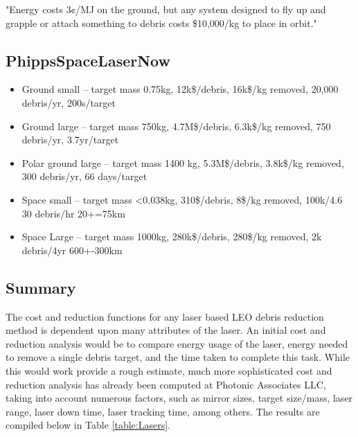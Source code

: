 \documentclass{article}
\begin{document}
"Energy costs 3¢/MJ on the ground, but any system designed to fly up and grapple or attach something to debris costs \$10,000/kg to place in orbit."


\subsection{PhippsSpaceLaserNow}\cite{PhippsSpaceLaserNow}

\begin{itemize}
\item Ground small -- target mass 0.75kg, 12k\$/debris, 16k\$/kg removed, 20,000 debris/yr, 200s/target

\item Ground large -- target mass 750kg, 4.7M\$/debris, 6.3k\$/kg removed, 750 debris/yr, 3.7yr/target

\item Polar ground large -- target mass 1400 kg, 5.3M\$/debris, 3.8k\$/kg removed, 300 debris/yr, 66 days/target
 
\item Space small -- target mass <0.038kg, 310\$/debris, 8\$/kg removed, 100k/4.6 30 debris/hr
20+=75km
\item Space Large -- target mass 1000kg, 280k\$/debris, 280\$/kg removed, 2k debris/4yr
600+-300km

\end{itemize}


\subsection{Summary}

The cost and reduction functions for any laser based LEO debris reduction method is dependent upon many attributes of the laser. An initial cost and reduction analysis would be to compare energy usage of the laser, energy needed to remove a single debris target, and the time taken to complete this task. While this would work provide a rough estimate, much more sophisticated cost and reduction analysis has already been computed at Photonic Associates LLC, taking into account numerous factors, such as mirror sizes, target size/mass, laser range, laser down time, laser tracking time, among others. The results are compiled below in Table \ref{table:Lasers}.
 
\end{document}
